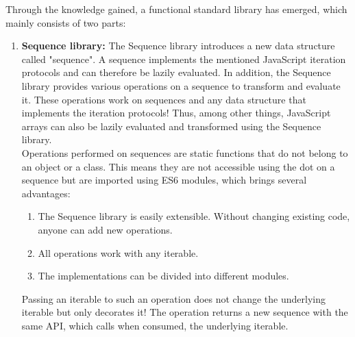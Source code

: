 Through the knowledge gained, a functional standard library has emerged, which
mainly consists of two parts:\\
\begin{enumerate}
  \item \textbf{Sequence library:} The Sequence library introduces a new data
    structure called "sequence". A sequence implements the mentioned JavaScript
    iteration protocols and can therefore be lazily evaluated. In addition, the
    Sequence library provides various operations on a sequence to transform and
    evaluate it. These operations work on sequences and any data structure that
    implements the iteration protocols! Thus, among other things, JavaScript
    arrays can also be lazily evaluated and transformed using the Sequence
    library.\\
    Operations performed on sequences are static functions that do not belong
    to an object or a class. This means they are not accessible using the dot
    on a sequence but are imported using ES6 modules, which brings several
    advantages:
      \begin{enumerate}
        \item The Sequence library is easily extensible. Without changing existing
          code, anyone can add new operations.
        \item All operations work with any iterable.
        \item The implementations can be divided into different modules.
      \end{enumerate}
  Passing an iterable to such an operation does not change the underlying
  iterable but only decorates it! The operation returns a new sequence with the
  same API, which calls when consumed, the underlying iterable.


\end{enumerate}

